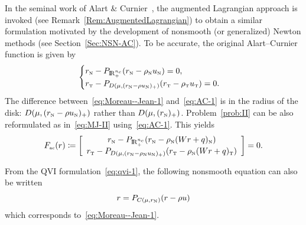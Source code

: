 { In the seminal work of  Alart \& Curnier~\cite{Curnier.Alart88,Alart.Curnier1991}, the augmented Lagrangian approach is invoked (see Remark~\ref{Rem:AugmentedLagrangian}) to obtain a  similar formulation motivated by the development of nonsmooth (or generalized) Newton methods (see Section~\ref{Sec:NSN-AC}). To be accurate, the original Alart--Curnier function is given by 
\begin{equation}
  \label{eq:AC-1}
  \begin{cases}
    r_\n - P_{\RR^{n_c}_+}(r_\n - \rho_\n  u_\n) = 0, \\
    r_\t - P_{D(\mu, (r_\n - \rho u_\n)_+)}(r_\t - \rho_\t u_\t   )=0.
  \end{cases}
\end{equation}
The difference between~\eqref{eq:Moreau--Jean-1} and~\eqref{eq:AC-1} is in the radius of the disk: $D(\mu, (r_{\hbox{\tiny{N}}} - \rho u_{\hbox{\tiny{N}}})_+)$ rather than $D(\mu, (r_{{\hbox{\tiny{N}}}})_+)$.
Problem~\ref{prob:II} can be also reformulated as in~\eqref{eq:MJ-II} using~\eqref{eq:AC-1}.
This yields
\begin{equation}
  \label{eq:AC-II}
    F_{\actwo}(r) \coloneqq \left[ \begin{array}{c}
    r_\n - P_{\RR^{n_c}_+}(r_\n - \rho_\n (W r +  q)_\n) \\
    r_\t - P_{D(\mu, (r_\n - \rho_\n u_\n)_+)}(r_\t - \rho_\n (W r +  q)_\t   )
  \end{array}\right] =0.
\end{equation}

\begin{remark}
  From the QVI formulation~\eqref{eq:qvi-1}, the following nonsmooth
  equation can also be written
  \begin{equation}
    \label{eq:qvi-proj}
    r = P_{C(\mu,r_\n)}(r-\rho u)
  \end{equation}
  which  corresponds to~\eqref{eq:Moreau--Jean-1}. 
\end{remark}

}
